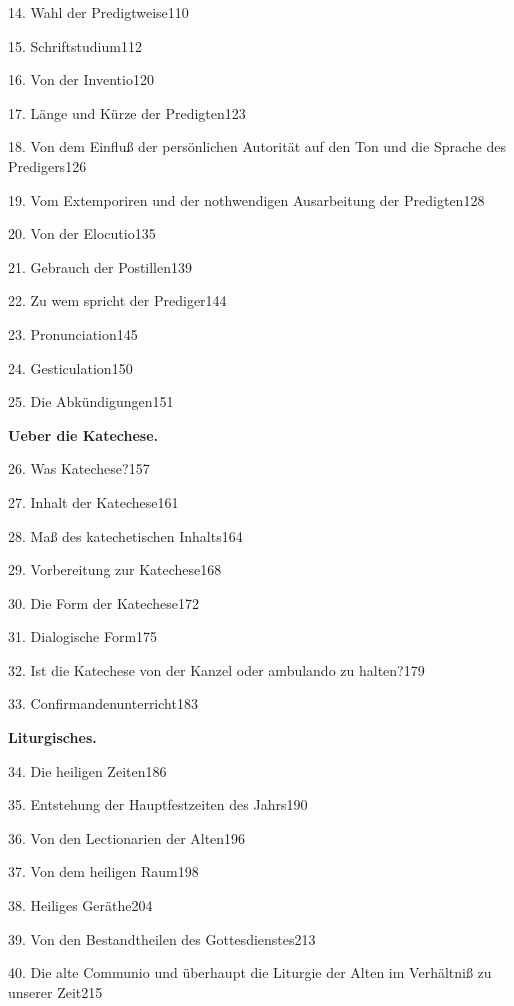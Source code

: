 14. Wahl der Predigtweise\hfill 110

15. Schriftstudium\hfill 112

16. Von der Inventio\hfill 120

17. Länge und Kürze der Predigten\hfill 123

18. Von dem Einfluß der persönlichen Autorität auf den Ton und die Sprache des Predigers\hfill 126

19. Vom Extemporiren und der nothwendigen Ausarbeitung der Predigten\hfill 128

20. Von der Elocutio\hfill 135

21. Gebrauch der Postillen\hfill 139

22. Zu wem spricht der Prediger\hfill 144

23. Pronunciation\hfill 145

24. Gesticulation\hfill 150

25. Die Abkündigungen\hfill 151

\par\medskip\noindent\textbf{Ueber die Katechese.}\par\nopagebreak

26. Was Katechese?\hfill 157

27. Inhalt der Katechese\hfill 161

28. Maß des katechetischen Inhalts\hfill 164

29. Vorbereitung zur Katechese\hfill 168

30. Die Form der Katechese\hfill 172

31. Dialogische Form\hfill 175

32. Ist die Katechese von der Kanzel oder ambulando zu halten?\hfill 179

33. Confirmandenunterricht\hfill 183

\par\medskip\noindent\textbf{Liturgisches.}\par\nopagebreak

34. Die heiligen Zeiten\hfill 186

35. Entstehung der Hauptfestzeiten des Jahrs\hfill 190

36. Von den Lectionarien der Alten\hfill 196

37. Von dem heiligen Raum\hfill 198

38. Heiliges Geräthe\hfill 204

39. Von den Bestandtheilen des Gottesdienstes\hfill 213

40. Die alte Communio und überhaupt die Liturgie der Alten im Verhältniß zu unserer Zeit\hfill 215

